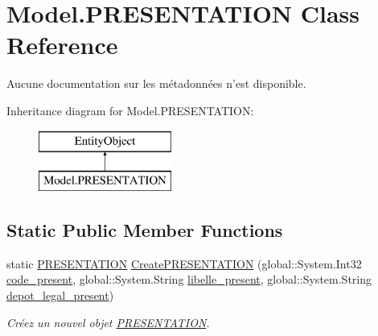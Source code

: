 \hypertarget{class_model_1_1_p_r_e_s_e_n_t_a_t_i_o_n}{\section{Model.\-P\-R\-E\-S\-E\-N\-T\-A\-T\-I\-O\-N Class Reference}
\label{class_model_1_1_p_r_e_s_e_n_t_a_t_i_o_n}
}


Aucune documentation sur les métadonnées n'est disponible.  


Inheritance diagram for Model.\-P\-R\-E\-S\-E\-N\-T\-A\-T\-I\-O\-N\-:\begin{figure}[H]
\begin{center}
\leavevmode
\includegraphics[height=2.000000cm]{class_model_1_1_p_r_e_s_e_n_t_a_t_i_o_n}
\end{center}
\end{figure}
\subsection*{Static Public Member Functions}
\begin{DoxyCompactItemize}
\item 
static \hyperlink{class_model_1_1_p_r_e_s_e_n_t_a_t_i_o_n}{P\-R\-E\-S\-E\-N\-T\-A\-T\-I\-O\-N} \hyperlink{class_model_1_1_p_r_e_s_e_n_t_a_t_i_o_n_a2d14b8c142e8bc7e1079e977aca12951}{Create\-P\-R\-E\-S\-E\-N\-T\-A\-T\-I\-O\-N} (global\-::\-System.\-Int32 \hyperlink{class_model_1_1_p_r_e_s_e_n_t_a_t_i_o_n_a97c7cbefa08736b44382aec5dda9adf4}{code\-\_\-present}, global\-::\-System.\-String \hyperlink{class_model_1_1_p_r_e_s_e_n_t_a_t_i_o_n_ae64c2be728fa1e6dbd1a5766e4453d07}{libelle\-\_\-present}, global\-::\-System.\-String \hyperlink{class_model_1_1_p_r_e_s_e_n_t_a_t_i_o_n_a9e2fa4b05a5ce426e1c1cc8ec44b25bc}{depot\-\_\-legal\-\_\-present})
\begin{DoxyCompactList}\small\item\em Créez un nouvel objet \hyperlink{class_model_1_1_p_r_e_s_e_n_t_a_t_i_o_n}{P\-R\-E\-S\-E\-N\-T\-A\-T\-I\-O\-N}. \end{DoxyCompactList}\end{DoxyCompactItemize}
